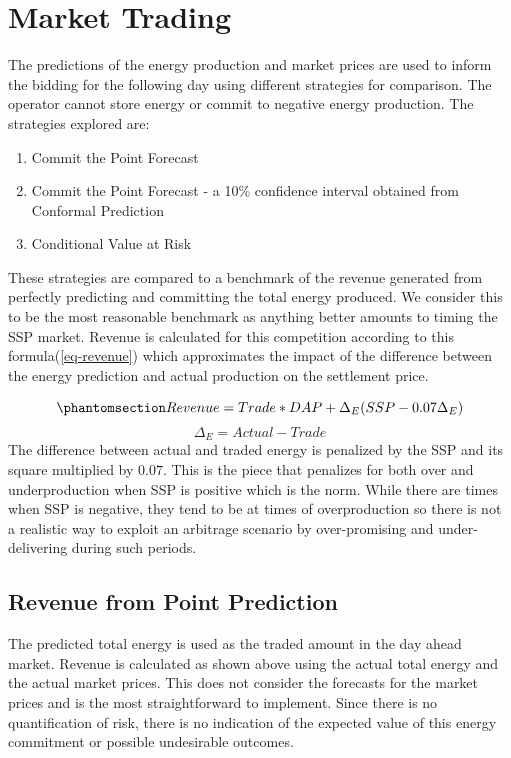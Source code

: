 \documentclass[
  journal,
]{IEEEtran}%
\providecommand{\tightlist}{%
  \setlength{\itemsep}{0pt}\setlength{\parskip}{0pt}}\usepackage{longtable,booktabs,array}
\begin{document}
\section{Market Trading}\label{market-trading}

The predictions of the energy production and market prices are used to
inform the bidding for the following day using different strategies for
comparison. The operator cannot store energy or commit to negative
energy production. The strategies explored are:

\begin{enumerate}
\def\labelenumi{\arabic{enumi}.}
\tightlist
\item
  Commit the Point Forecast
\item
  Commit the Point Forecast - a 10\% confidence interval obtained from
  Conformal Prediction
\item
  Conditional Value at Risk
\end{enumerate}

These strategies are compared to a benchmark of the revenue generated
from perfectly predicting and committing the total energy produced. We
consider this to be the most reasonable benchmark as anything better
amounts to timing the SSP market. Revenue is calculated for this
competition according to this formula(\ref{eq-revenue}) which
approximates the impact of the difference between the energy prediction
and actual production on the settlement price.

\begin{equation}\phantomsection\label{eq-revenue}{
Revenue = Trade*DAP + \Delta_E (SSP - 0.07 \Delta_E)
}\end{equation} \[
\Delta_E = Actual - Trade
\] The difference between actual and traded energy is penalized by the
SSP and its square multiplied by \(0.07\). This is the piece that
penalizes for both over and underproduction when SSP is positive which
is the norm. While there are times when SSP is negative, they tend to be
at times of overproduction so there is not a realistic way to exploit an
arbitrage scenario by over-promising and under-delivering during such
periods.

\subsection{Revenue from Point
Prediction}\label{revenue-from-point-prediction}

The predicted total energy is used as the traded amount in the day ahead
market. Revenue is calculated as shown above using the actual total
energy and the actual market prices. This does not consider the
forecasts for the market prices and is the most straightforward to
implement. Since there is no quantification of risk, there is no
indication of the expected value of this energy commitment or possible
undesirable outcomes.
\end{document}
